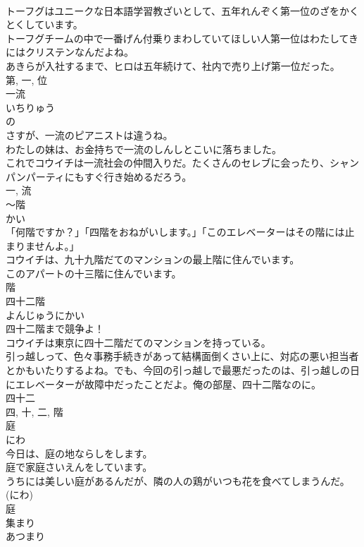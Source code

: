 \documentclass[8pt]{extreport}
\begin{document}
\begin{CJK}{UTF8}{min}
\\	トーフグはユニークな日本語学習教ざいとして、五年れんぞく第一位のざをかくとくしています。	
\\	トーフグチームの中で一番げん付乗りまわしていてほしい人第一位はわたしてきにはクリステンなんだよね。	
\\	あきらが入社するまで、ヒロは五年続けて、社内で売り上げ第一位だった。	
\\	第, 一, 位	
\\	一流	
\\	いちりゅう	
\\	の 
\\	さすが、一流のピアニストは違うね。	
\\	わたしの妹は、お金持ちで一流のしんしとこいに落ちました。	
\\	これでコウイチは一流社会の仲間入りだ。たくさんのセレブに会ったり、シャンパンパーティにもすぐ行き始めるだろう。	
\\	一, 流	
\\	〜階	
\\	かい	
\\	「何階ですか？」「四階をおねがいします。」「このエレベーターはその階には止まりませんよ。」	
\\	コウイチは、九十九階だてのマンションの最上階に住んでいます。	
\\	このアパートの十三階に住んでいます。	
\\	階	
\\	四十二階	
\\	よんじゅうにかい	
\\	四十二階まで競争よ！	
\\	コウイチは東京に四十二階だてのマンションを持っている。	
\\	引っ越しって、色々事務手続きがあって結構面倒くさい上に、対応の悪い担当者とかもいたりするよね。でも、今回の引っ越しで最悪だったのは、引っ越しの日にエレベーターが故障中だったことだよ。俺の部屋、四十二階なのに。	
\\	四十二 
\\	四, 十, 二, 階	
\\	庭	
\\	にわ	
\\	今日は、庭の地ならしをします。	
\\	庭で家庭さいえんをしています。	
\\	うちには美しい庭があるんだが、隣の人の鶏がいつも花を食べてしまうんだ。	
\\	(にわ) 
\\	庭	
\\	集まり	
\\	あつまり	

\end{CJK}
\end{document}
